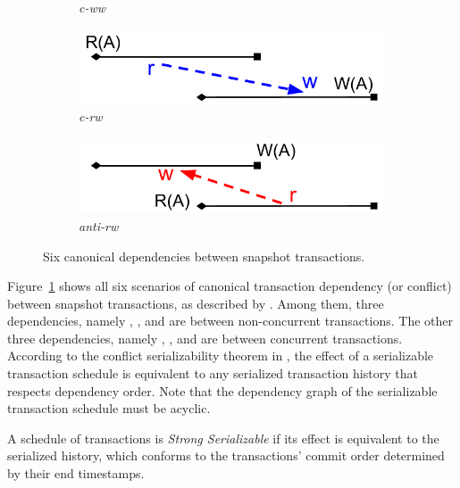 {\begin{figure}
\begin{subfigure}{0.45\textwidth}
      \caption{\textit{c-ww}}
  \end{subfigure}
  \begin{subfigure}{0.45\textwidth}
      \includegraphics[width=0.99\textwidth]{diagram/txn/dependency/theory_concurrent_rw.pdf} 
      \caption{\textit{c-rw}}
  \end{subfigure}
  \begin{subfigure}{0.45\textwidth}
      \includegraphics[width=0.99\textwidth]{diagram/txn/dependency/theory_concurrent_antirw.pdf} 
      \caption{\textit{anti-rw}}
  \end{subfigure}  
  \caption{Six canonical dependencies between snapshot transactions.}
  \label{diagram:txn:theory_dependencies}
\end{figure}

Figure~\ref{diagram:txn:theory_dependencies} shows all six scenarios of canonical transaction dependency (or conflict) between snapshot transactions, as described by
\cite{fekete2005making}.
%
Among them, three dependencies, namely , , and
 are between non-concurrent transactions.
%
The other three dependencies, namely , , and  are between concurrent transactions.
%
According to the conflict serializability theorem in
\cite{weikum2001transactional}, the effect of a serializable transaction
schedule is equivalent to any serialized transaction history that respects
dependency order.
%
Note that the dependency graph of the serializable transaction schedule must be acyclic.

\begin{definition}
  A schedule of transactions is \textit{Strong Serializable} if its effect is
  equivalent to the serialized history, which conforms to the transactions'
  commit order determined by their end timestamps.
\end{definition}

}
